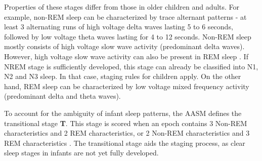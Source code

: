 Properties of these stages differ from those in older children and adults. For example, non-REM sleep
can be characterized by trace alternant patterns - at least 3 alternating runs of high voltage delta waves
lasting 5 to 6 seconds, followed by low voltage theta waves lasting for 4 to 12 seconds.
Non-REM sleep mostly consists of high voltage slow wave activity (predominant delta waves). However,
high voltage slow wave activity can also be present in REM sleep \cite{AASM}. If NREM stage is sufficiently
developed, this stage can already be classified into N1, N2 and N3 sleep. In that case, staging rules for children apply.
On the other hand, REM sleep can be characterized by low voltage mixed frequency activity (predominant delta and theta waves).

To account for the ambiguity of infant sleep patterns, the AASM defines the transitional stage \textbf{T}. This stage is scored when
an epoch contains 3 Non-REM characteristics and 2 REM characteristics, or 2 Non-REM characteristics and 3 REM characteristics \cite{AASM}.
The transitional stage aids the staging process, as clear sleep stages in infants are not yet fully developed.